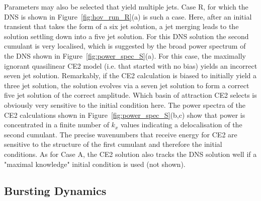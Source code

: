 \documentclass{jfm}
\begin{document}
Parameters may also be selected that yield multiple jets. Case R, for which the DNS is shown in Figure~\ref{fig:hov_run_R}(a) is such a case. Here, after an initial transient that takes the form of a six jet solution, a jet merging leads to the solution settling down into a five jet solution. For this DNS solution the second cumulant is very localised, which is suggested by the broad power spectrum of the DNS shown in Figure~\ref{fig:power_spec_S}(a). For this case, the maximally ignorant quasilinear CE2 model  (i.e. that started with no bias) yields an incorrect seven jet solution. Remarkably, if the CE2 calculation is biased to initially yield a three jet solution, the solution evolves via a seven jet solution to form a correct five jet solution of the correct amplitude. Which basin of attraction CE2 selects is obviously very sensitive to the initial condition here. The power spectra of the CE2 calculations shown in Figure~\ref{fig:power_spec_S}(b,c) show that power is concentrated in a finite number of $k_x$ values indicating a delocalisation of the second cumulant. The precise wavenumbers that receive energy for CE2 are sensitive to the structure of the first cumulant and therefore the initial conditions.  As for Case A, the CE2 solution also tracks the DNS solution well if a "maximal knowledge" initial condition is used (not shown).



\subsection{Bursting Dynamics}
\end{document}
